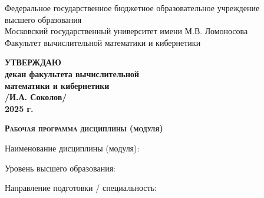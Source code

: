 \documentclass[a4paper, 12pt]{article}
\begin{document}

\begin{titlepage}

    \centering

    Федеральное государственное бюджетное образовательное учреждение\\
    высшего образования \\
    Московский государственный университет имени М.В. Ломоносова\\
    Факультет вычислительной математики и кибернетики

    \vspace{24pt}

    \begin{flushright}
        \textbf{
        УТВЕРЖДАЮ\\
        декан факультета вычислительной\\
        математики и кибернетики\\
        \vspace{12pt}
        \underline{\hspace{2.5cm}} /И.А. Соколов/\\
        \flqq \underline{\hspace{1cm}}\frqq \underline{\hspace{3cm}} 2025 г.}
    \end{flushright}

    \vspace{24pt}

    \textbf{\textsc{Рабочая программа дисциплины (модуля)}}

    \vspace{24pt}

    Наименование дисциплины (модуля):\\
    \textbf{\underline{}}

    \vspace{16pt}

    Уровень высшего образования:\\
    \textbf{}

    \vspace{16pt}

    Направление подготовки / специальность:\\
    \textbf{}


\end{titlepage}
\end{document}
